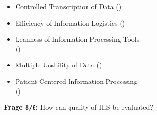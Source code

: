 \begin{itemize}
  \item Controlled Transcription of Data ()
  \item Efficiency of Information Logistics ()
  \item Leanness of Information Processing Tools \\
  ()
  \item Multiple Usability of Data ()
  \item Patient-Centered Information Processing \\
  ()
\end{itemize}

\textbf{Frage \texttt{8/6}:} How can quality of HIS be evaluated?

